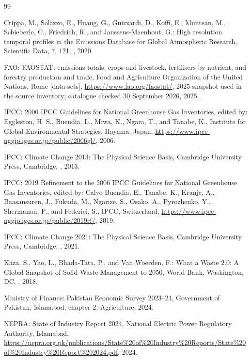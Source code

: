 \documentclass[essd]{copernicus}
\begin{document}
\begin{thebibliography}{99}

Crippa, M., Solazzo, E., Huang, G., Guizzardi, D., Koffi, E., Muntean, M., Schieberle, C., Friedrich, R., and Janssens-Maenhout, G.: High resolution temporal profiles in the Emissions Database for Global Atmospheric Research, Scientific Data, 7, 121, , 2020.

FAO: FAOSTAT: emissions totals, crops and livestock, fertilisers by nutrient, and forestry production and trade, Food and Agriculture Organization of the United Nations, Rome [data sets], \url{https://www.fao.org/faostat/}, 2025 snapshot used in the source inventory; catalogue checked 30 September 2026, 2025.

IPCC: 2006 IPCC Guidelines for National Greenhouse Gas Inventories, edited by: Eggleston, H. S., Buendia, L., Miwa, K., Ngara, T., and Tanabe, K., Institute for Global Environmental Strategies, Hayama, Japan, \url{https://www.ipcc-nggip.iges.or.jp/public/2006gl/}, 2006.

IPCC: Climate Change 2013: The Physical Science Basis, Cambridge University Press, Cambridge, , 2013.

IPCC: 2019 Refinement to the 2006 IPCC Guidelines for National Greenhouse Gas Inventories, edited by: Calvo Buendia, E., Tanabe, K., Kranjc, A., Baasansuren, J., Fukuda, M., Ngarize, S., Osako, A., Pyrozhenko, Y., Shermanau, P., and Federici, S., IPCC, Switzerland, \url{https://www.ipcc-nggip.iges.or.jp/public/2019rf/}, 2019.

IPCC: Climate Change 2021: The Physical Science Basis, Cambridge University Press, Cambridge, , 2021.

Kaza, S., Yao, L., Bhada-Tata, P., and Van Woerden, F.: What a Waste 2.0: A Global Snapshot of Solid Waste Management to 2050, World Bank, Washington, DC, , 2018.

Ministry of Finance: Pakistan Economic Survey 2023--24, Government of Pakistan, Islamabad, chapter 2, Agriculture, 2024.

NEPRA: State of Industry Report 2024, National Electric Power Regulatory Authority, Islamabad, \url{https://nepra.org.pk/publications/State%20of%20Industry%20Reports/State%20of%20Industry%20Report%202024.pdf}, 2024.


\end{thebibliography}
\end{document}
